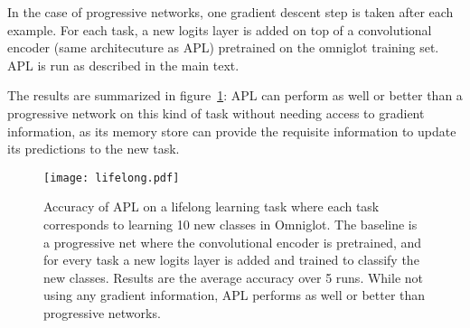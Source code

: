 \documentclass{article} \usepackage{iclr2019_conference,times}
\begin{document}
In the case of progressive networks, one gradient descent step is taken after each example. For each task, a new logits layer is added on top of a convolutional encoder (same architecuture as APL) pretrained on the omniglot training set. APL is run as described in the main text. 

The results are summarized in figure~\ref{fig:llearn}: APL can perform as well or better than a progressive network on this kind of task without needing access to gradient information, as its memory store can provide the requisite information to update its predictions to the new task.

\begin{figure}[ht!]
\begin{center}
\texttt{[image: lifelong.pdf]}
\end{center}
\caption{Accuracy of APL on a lifelong learning task where each task corresponds to learning 10 new classes in Omniglot. The baseline is a progressive net where the convolutional encoder is pretrained, and for every task a new logits layer is added and trained to classify the new classes. Results are the average accuracy over 5 runs. While not using any gradient information, APL performs as well or better than progressive networks.}
\label{fig:llearn}
\end{figure}
\end{document}
